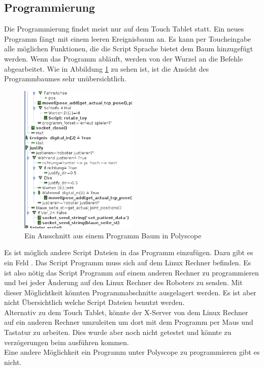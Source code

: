 \subsection{Programmierung}
\label{sub:programmierung_polyscope_rel}

Die Programmierung findet meist nur auf dem Touch Tablet statt. Ein neues Programm fängt mit einem leeren Ereignisbaum an. Es kann per Toucheingabe alle möglichen Funktionen, die die Script Sprache bietet dem Baum hinzugefügt werden. Wenn das Programm abläuft, werden von der Wurzel an die Befehle abgearbeitet.
Wie in Abbildung \ref{fig:programm_in_polyscope} zu sehen ist, ist die Ansicht des Programmbaumes sehr unübersichtlich.

\begin{figure}[H]
  \centering
    \includegraphics[width=0.5\textwidth]{pic/polyscope_program_tree.png}
      \caption[Programm Baum in Polyscope]{Ein Ausschnitt aus einem Programm Baum in Polyscope}
      \label{fig:programm_in_polyscope}
\end{figure}

Es ist möglich andere Script Dateien in das Programm einzufügen. Dazu gibt es ein Feld . Das Script Programm muss sich auf dem Linux Rechner befinden. Es ist also nötig das Script Programm auf einem anderen Rechner zu programmieren und bei jeder Änderung auf den Linux Rechner des Roboters zu senden. Mit dieser Möglichtkeit könnten Programmabschnitte ausgelagert werden. Es ist aber nicht Übersichtlich welche Script Dateien benutzt werden.\\
Alternativ zu dem Touch Tablet, könnte der X-Server von dem Linux Rechner auf ein anderen Rechner umzuleiten um dort mit dem Programm per Maus und Tastatur zu arbeiten. Dies wurde aber noch nicht getestet und könnte zu verzögerungen beim ausführen kommen.
\\
Eine andere Möglichkeit ein Programm unter Polyscope zu programmieren gibt es nicht.

